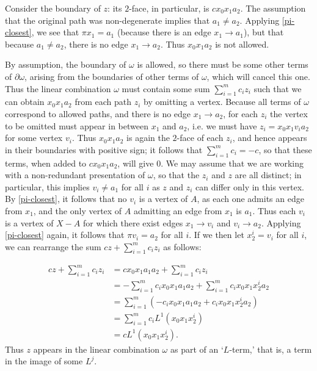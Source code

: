 \documentclass[11pt]{article}
\theoremstyle{definition}
\numberwithin{equation}{section}
\newcommand{\bd}{\partial}
\begin{document}
Consider the boundary of $z$: its $2$-face, in particular, is $c x_0 x_1 a_2$. The assumption that the original path was non-degenerate implies that $a_1 \neq a_2$. Applying \cref{pi-closest}, we see that $\pi x_1 = a_1$ (because there is an edge $x_1 \to a_1$), but that because $a_1 \neq a_2$, there is no edge $x_1 \to a_2$. Thus $x_0 x_1 a_2$ is not allowed. 

By assumption, the boundary of $\omega$ is allowed, so there must be some other terms of $\bd \omega$, arising from the boundaries of other terms of $\omega$, which will cancel this one. Thus the linear combination $\omega$ must contain some sum $\sum_{i=1}^m c_i z_i$ such that we can obtain $x_0 x_1 a_2$ from each path $z_i$ by omitting a vertex. Because all terms of $\omega$ correspond to allowed paths, and there is no edge $x_1 \to a_2$, for each $z_i$ the vertex to be omitted must appear in between $x_1$ and $a_2$, i.e.  we must have $z_i = x_0 x_1 v_i a_2$ for some vertex $v_i$. Thus $x_0 x_1 a_2$ is again the $2$-face of each $z_i$, and hence appears in their boundaries with positive sign; it follows that $\sum_{i = 1}^m c_i = -c$, so that these terms, when added to $c x_0 x_1 a_2$, will give $0$. We may assume that we are working with a non-redundant presentation of $\omega$, so that the $z_i$ and $z$ are all distinct; in particular, this implies $v_i \neq a_1$ for all $i$ as $z$ and $z_i$ can differ only in this vertex. By \cref{pi-closest}, it follows that no $v_i$ is a vertex of $A$, as each one admits an edge from $x_1$, and the only vertex of $A$ admitting an edge from $x_1$ is $a_1$. Thus each $v_i$ is a vertex of $X - A$ for which there exist edges $x_1 \to v_i$ and $v_i \to a_2$. Applying \cref{pi-closest} again, it follows that $\pi v_i = a_2$ for all $i$.
If we then let $x^i_2 = v_i$ for all $i$, we can rearrange the sum $c z + \sum_{i=1}^m c_i z_i$ as follows:


\begin{align*}
c z + \sum_{i=1}^m c_i z_i & = cx_0 x_1 a_1 a_2 + \sum_{i=1}^m c_i z_i \\
& = - \sum_{i=1}^m c_i x_0 x_1 a_1 a_2 + \sum_{i=1}^m c_i x_0 x_1 x_2^i a_2 \\
& = \sum_{i=1}^m(- c_i x_0 x_1 a_1 a_2 + c_i x_0 x_1 x_2^i a_2) \\
& = \sum_{i=1}^m c_i L^1(x_0 x_1 x_2^i) \\
& = c L^1(x_0 x_1 x_2^i).
\end{align*}
Thus $z$ appears in the linear combination $\omega$ as part of an `$L$-term,' that is, a term in the image of some $L^j$. 
\end{document}
